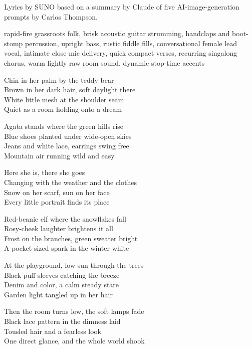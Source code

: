 
\begin{notes}
Lyrics by SUNO based on a summary by Claude of five AI-image-generation prompts by Carlos Thompson.
\end{notes}
\begin{style}
rapid-fire grassroots folk, brisk acoustic guitar strumming, handclaps and boot-stomp percussion, upright bass, rustic fiddle fills, conversational female lead vocal, intimate close-mic delivery, quick compact verses, recurring singalong chorus, warm lightly raw room sound, dynamic stop-time accents
\end{style}
\begin{lyrics}
Chin in her palm by the teddy bear\\
Brown in her dark hair, soft daylight there\\
White little mesh at the shoulder seam\\
Quiet as a room holding onto a dream

Agata stands where the green hills rise\\
Blue shoes planted under wide-open skies\\
Jeans and white lace, earrings swing free\\
Mountain air running wild and easy

Here she is, there she goes\\
Changing with the weather and the clothes\\
Snow on her scarf, sun on her face\\
Every little portrait finds its place

Red-beanie elf where the snowflakes fall\\
Rosy-cheek laughter brightens it all\\
Frost on the branches, green sweater bright\\
A pocket-sized spark in the winter white

At the playground, low sun through the trees\\
Black puff sleeves catching the breeze\\
Denim and color, a calm steady stare\\
Garden light tangled up in her hair

Then the room turns low, the soft lamps fade\\
Black lace pattern in the dimness laid\\
Tousled hair and a fearless look\\
One direct glance, and the whole world shook


\end{lyrics}
